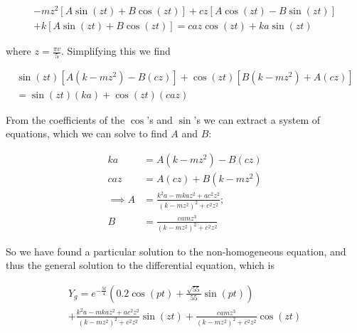 \documentclass[12pt]{article}
\begin{document}
\begin{enumerate}
        \begin{equation*}
            \begin{gathered}
                -mz^2[A\sin(zt)+B\cos(zt)]+cz[A\cos(zt)-B\sin(zt)] \\
                +k[A\sin(zt)+B\cos(zt)]=caz\cos(zt)+ka\sin(zt)
            \end{gathered}
        \end{equation*}

        where $z=\frac{\pi v}{5}$. Simplifying this we find 

        \begin{equation*}
            \begin{gathered}
                \sin(zt)[A(k-mz^2)-B(cz)]+\cos(zt)[B(k-mz^2)+A(cz)] \\
                =\sin(zt)(ka)+\cos(zt)(caz)
            \end{gathered}
        \end{equation*}

        From the coefficients of the $\cos$'s and $\sin$'s we can extract a system of equations, which we 
        can solve to find $A$ and $B$:

        \begin{equation*}
            \begin{split}
                ka &= A(k-mz^2)-B(cz) \\
                caz &= A(cz)+B(k-mz^2) \\
                \implies A &= \frac{k^2a-mkaz^2+ac^2z^2}{(k-mz^2)^2+c^2z^2}; \\
                B &= \frac{camz^3}{(k-mz^2)^2+c^2z^2}
            \end{split}
        \end{equation*}

        So we have found a particular solution to the non-homogeneous equation, and thus the general 
        solution to the differential equation, which is 

        \begin{equation}
            \begin{gathered}
                Y_g = e^{-\frac{5t}{4}}(0.2\cos(pt)+\frac{\sqrt{55}}{55}\sin(pt)) \\
                +\frac{k^2a-mkaz^2+ac^2z^2}{(k-mz^2)^2+c^2z^2}\sin(zt)+\frac{camz^3}{(k-mz^2)^2+c^2z^2}\cos(zt)
            \end{gathered}
            \label{eqn:non-homogeneous gen sol}
        \end{equation}
        

\end{enumerate}
\end{document}
